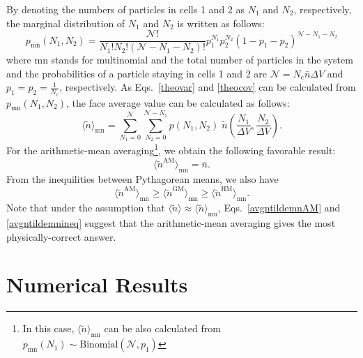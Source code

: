 \documentclass{article}
\newcommand{\dV}{{\Delta V}}
\newcommand{\avgntilde}{{\langle\tilde{n}\rangle}}
\newcommand{\Nc}{{N_\mathrm{c}}}
\newcommand{\nb}{\bar{n}}
\begin{document}
By denoting the numbers of particles in cells 1 and 2 as $N_1$ and $N_2$, respectively, the marginal distribution of $N_1$ and $N_2$ is written as follows:
\begin{equation}
p_\mathrm{mn}(N_1,N_2)=\frac{\mathcal{N}!}{N_1! N_2!(\mathcal{N}-N_1-N_2)!}p_1^{N_1}p_2^{N_2}(1-p_1-p_2)^{\mathcal{N}-N_1-N_2}
\end{equation}
where mn stands for multinomial and the total number of particles in the system and the probabilities of a particle staying in cells 1 and 2 are $\mathcal{N}=\Nc\nb\dV$ and $p_1=p_2=\frac{1}{\Nc}$, respectively.
As Eqs.~\eqref{theovar} and \eqref{theocov} can be calculated from $p_\mathrm{mn}(N_1,N_2)$, the face average value can be calculated as follows:
\begin{equation}
\label{avgntilde_mn}
\langle\tilde{n}\rangle_\mathrm{mn}=
\sum_{N_1=0}^{\mathcal{N}}\sum_{N_2=0}^{\mathcal{N}-N_1}p(N_1,N_2)\;
\tilde{n}\!\left(\frac{N_1}{\dV},\frac{N_2}{\dV}\right).
\end{equation}
For the arithmetic-mean averaging\footnote{In this case, $\avgntilde_\mathrm{mn}$ can be also calculated from $p_\mathrm{mn}(N_1)\sim\mathrm{Binomial}(\mathcal{N},p_1)$}, we obtain the following favorable result:
\begin{equation}
\label{avgntildemnAM}
\langle\tilde{n}^\mathrm{AM}\rangle_\mathrm{mn}=\nb.
\end{equation}
From the inequilities between Pythagorean means, we also have
\begin{equation}
\label{avgntildemnineq}
\langle\tilde{n}^\mathrm{AM}\rangle_\mathrm{mn}
\ge\langle\tilde{n}^\mathrm{GM}\rangle_\mathrm{mn}
\ge\langle\tilde{n}^\mathrm{HM}\rangle_\mathrm{mn}.
\end{equation}
Note that under the assumption that $\avgntilde\approx\avgntilde_\mathrm{mn}$, Eqs.~\eqref{avgntildemnAM} and \eqref{avgntildemnineq} suggest that the arithmetic-mean averaging gives the most physically-correct answer.

\section{Numerical Results}
\end{document}
